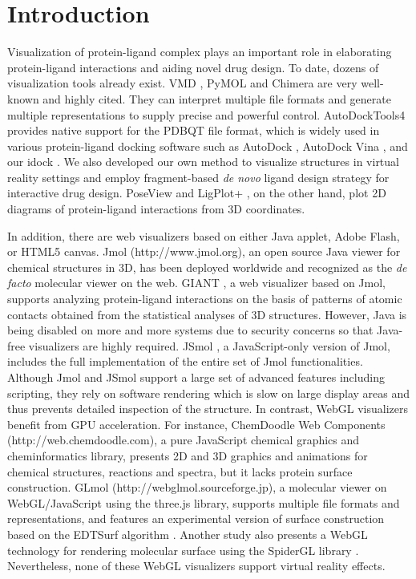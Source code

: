 \documentclass[twocolumn]{bmcart}%
\begin{document}
\section*{Introduction}
Visualization of protein-ligand complex plays an important role in elaborating protein-ligand interactions and aiding novel drug design. To date, dozens of visualization tools already exist. VMD \cite{1220}, PyMOL \cite{1221} and Chimera \cite{1219} are very well-known and highly cited. They can interpret multiple file formats and generate multiple representations to supply precise and powerful control. AutoDockTools4 \cite{596} provides native support for the PDBQT file format, which is widely used in various protein-ligand docking software such as AutoDock \cite{596}, AutoDock Vina \cite{595}, and our idock \cite{1153}. We also developed our own method \cite{1265} to visualize structures in virtual reality settings and employ fragment-based \textit{de novo} ligand design strategy for interactive drug design. PoseView \cite{748} and LigPlot+ \cite{951}, on the other hand, plot 2D diagrams of protein-ligand interactions from 3D coordinates.

In addition, there are web visualizers based on either Java applet, Adobe Flash, or HTML5 canvas. Jmol (http://www.jmol.org), an open source Java viewer for chemical structures in 3D, has been deployed worldwide and recognized as the \textit{de facto} molecular viewer on the web. GIANT \cite{1359}, a web visualizer based on Jmol, supports analyzing protein-ligand interactions on the basis of patterns of atomic contacts obtained from the statistical analyses of 3D structures. However, Java is being disabled on more and more systems due to security concerns so that Java-free visualizers are highly required. JSmol \cite{1314}, a JavaScript-only version of Jmol, includes the full implementation of the entire set of Jmol functionalities. Although Jmol and JSmol support a large set of advanced features including scripting, they rely on software rendering which is slow on large display areas and thus prevents detailed inspection of the structure. In contrast, WebGL visualizers benefit from GPU acceleration. For instance, ChemDoodle Web Components (http://web.chemdoodle.com), a pure JavaScript chemical graphics and cheminformatics library, presents 2D and 3D graphics and animations for chemical structures, reactions and spectra, but it lacks protein surface construction. GLmol (http://webglmol.sourceforge.jp), a molecular viewer on WebGL/JavaScript using the three.js library, supports multiple file formats and representations, and features an experimental version of surface construction based on the EDTSurf algorithm \cite{1297,1350}. Another study \cite{1262} also presents a WebGL technology for rendering molecular surface using the SpiderGL library \cite{1320}. Nevertheless, none of these WebGL visualizers support virtual reality effects.
\end{document}
